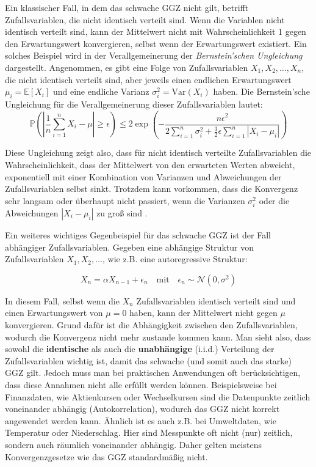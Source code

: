 \documentclass[12pt,a4paper]{article}
\begin{document}
Ein klassischer Fall, in dem das schwache GGZ nicht gilt, betrifft Zufallsvariablen, die nicht identisch verteilt sind.
Wenn die Variablen nicht identisch verteilt sind, kann der Mittelwert nicht mit Wahrscheinlichkeit 1 gegen den Erwartungswert konvergieren, selbst wenn der Erwartungswert existiert.
Ein solches Beispiel wird in der Verallgemeinerung der \textit{Bernstein'schen Ungleichung} dargestellt.
Angenommen, es gibt eine Folge von Zufallsvariablen \(X_1, X_2, \dots, X_n\), die nicht identisch verteilt sind, aber jeweils einen endlichen Erwartungswert \(\mu_i = \mathbb{E}[X_i]\) und eine endliche Varianz \(\sigma_i^2 = \text{Var}(X_i)\) haben. Die Bernstein'sche Ungleichung für die Verallgemeinerung dieser Zufallsvariablen lautet:
\[
\mathbb{P}\left( \left|\frac{1}{n} \sum_{i=1}^n X_i - \mu \right| \geq \epsilon \right) \leq 2 \exp \left( -\frac{n \epsilon^2}{2 \sum_{i=1}^n \sigma_i^2 + \frac{3}{2} \epsilon \sum_{i=1}^n |X_i - \mu_i|} \right)
\]

Diese Ungleichung zeigt also, dass für nicht identisch verteilte Zufallsvariablen die Wahrscheinlichkeit, dass der Mittelwert von den erwarteten Werten abweicht, exponentiell mit einer Kombination von Varianzen und Abweichungen der Zufallsvariablen selbst sinkt.
Trotzdem kann vorkommen, dass die Konvergenz sehr langsam oder überhaupt nicht passiert, wenn die Varianzen \(\sigma_i^2\) oder die Abweichungen \(|X_i - \mu_i|\) zu groß sind \citep{stoyanov2013}.


Ein weiteres wichtiges Gegenbeispiel für das schwache GGZ ist der Fall abhängiger Zufallsvariablen.
Gegeben eine abhängige Struktur von Zufallsvariablen \(X_1, X_2, \dots\), wie z.B. eine autoregressive Struktur:

\[
X_n = \alpha X_{n-1} + \epsilon_n \quad \text{mit} \quad \epsilon_n \sim \mathcal{N}(0, \sigma^2)
\]

In diesem Fall, selbst wenn die \(X_n\) Zufallsvariablen identisch verteilt sind und einen Erwartungswert von \(\mu = 0\) haben, kann der Mittelwert nicht gegen \(\mu\) konvergieren.
Grund dafür ist die Abhängigkeit zwischen den Zufallsvariablen, wodurch die Konvergenz nicht mehr zustande kommen kann.
Man sieht also, dass sowohl die \textbf{identische} als auch die \textbf{unabhängige} (i.i.d.) Verteilung der Zufallsvariablen wichtig ist, damit das schwache (und somit auch das starke) GGZ gilt.
Jedoch muss man bei praktischen Anwendungen oft berücksichtigen, dass diese Annahmen nicht alle erfüllt werden können.
Beispielsweise bei Finanzdaten, wie Aktienkursen oder Wechselkursen sind die Datenpunkte zeitlich voneinander abhängig (Autokorrelation), wodurch das GGZ nicht korrekt angewendet werden kann.
Ähnlich ist es auch z.B. bei Umweltdaten, wie Temperatur oder Niederschlag.
Hier sind Messpunkte oft nicht (nur) zeitlich, sondern auch räumlich voneinander abhängig.
Daher gelten meistens Konvergenzgesetze wie das GGZ standardmäßig nicht.
\end{document}
